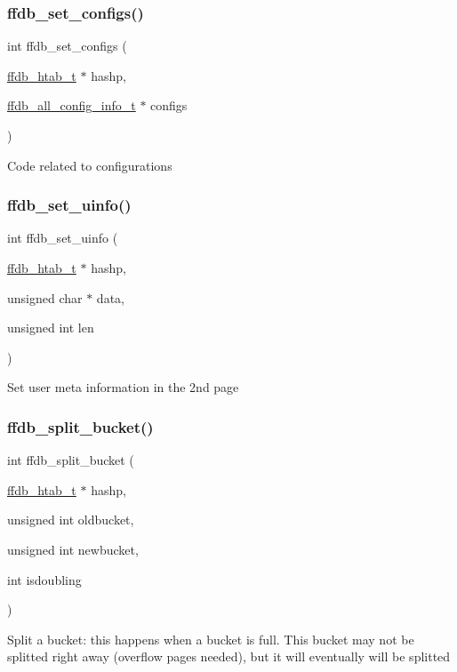 \subsubsection{\texorpdfstring{ffdb\_set\_configs()}{ffdb\_set\_configs()}}
{\footnotesize\ttfamily int ffdb\+\_\+set\+\_\+configs (\begin{DoxyParamCaption}\item[{\mbox{\hyperlink{adat-devel_2other__libs_2filedb_2filehash_2ffdb__hash_8h_ae592010ed2bedc975d3cc0b7d074b9d1}{ffdb\+\_\+htab\+\_\+t}} $\ast$}]{hashp,  }\item[{\mbox{\hyperlink{adat-devel_2other__libs_2filedb_2filehash_2ffdb__db_8h_afc17234e7cd387e11de55b92df6bb0e5}{ffdb\+\_\+all\+\_\+config\+\_\+info\+\_\+t}} $\ast$}]{configs }\end{DoxyParamCaption})}

Code related to configurations \mbox{\label{adat-devel_2other__libs_2filedb_2filehash_2ffdb__page_8c_a5c4cb0f890a593a92981b8f03d221337}} 
\subsubsection{\texorpdfstring{ffdb\_set\_uinfo()}{ffdb\_set\_uinfo()}}
{\footnotesize\ttfamily int ffdb\+\_\+set\+\_\+uinfo (\begin{DoxyParamCaption}\item[{\mbox{\hyperlink{adat-devel_2other__libs_2filedb_2filehash_2ffdb__hash_8h_ae592010ed2bedc975d3cc0b7d074b9d1}{ffdb\+\_\+htab\+\_\+t}} $\ast$}]{hashp,  }\item[{unsigned char $\ast$}]{data,  }\item[{unsigned int}]{len }\end{DoxyParamCaption})}

Set user meta information in the 2nd page \mbox{\label{adat-devel_2other__libs_2filedb_2filehash_2ffdb__page_8c_a2fef4034e4e48cba8a413957ac8cfbe2}} 
\subsubsection{\texorpdfstring{ffdb\_split\_bucket()}{ffdb\_split\_bucket()}}
{\footnotesize\ttfamily int ffdb\+\_\+split\+\_\+bucket (\begin{DoxyParamCaption}\item[{\mbox{\hyperlink{adat-devel_2other__libs_2filedb_2filehash_2ffdb__hash_8h_ae592010ed2bedc975d3cc0b7d074b9d1}{ffdb\+\_\+htab\+\_\+t}} $\ast$}]{hashp,  }\item[{unsigned int}]{oldbucket,  }\item[{unsigned int}]{newbucket,  }\item[{int}]{isdoubling }\end{DoxyParamCaption})}

Split a bucket\+: this happens when a bucket is full. This bucket may not be splitted right away (overflow pages needed), but it will eventually will be splitted 